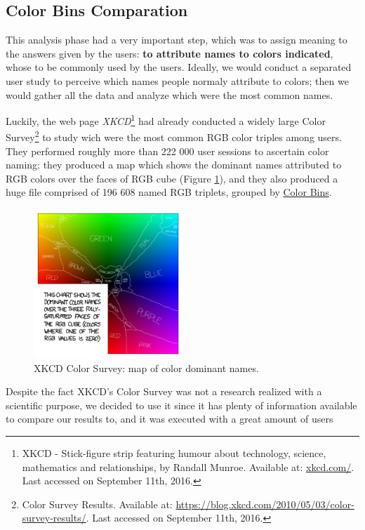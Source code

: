 \subsection{Color Bins Comparation}
\label{subsec:results_preparation}
%
This analysis phase had a very important step, which was to assign meaning to the answers given by the users: \textbf{to attribute names to colors indicated}, whose to be commonly used by the users.
Ideally, we would conduct a separated user study to perceive which names people normaly attribute to colors; then we would gather all the data and analyze which were the most common names. \par
%
Luckily, the web page \emph{XKCD}\footnote{XKCD - Stick-figure strip featuring humour about technology, science, mathematics and relationships, by Randall Munroe.
Available at: \url{xkcd.com/}. Last accessed on September 11th, 2016.} had already conducted a widely large Color Survey\footnote{Color Survey Results. Available at:
\url{https://blog.xkcd.com/2010/05/03/color-survey-results/}. Last accessed on September 11th, 2016.} to study wich were the most common RGB color triples among users. They performed roughly more
than 222 000 user sessions to ascertain color naming: they produced a map which shows the dominant names attributed to \gls{RGB} colors over the faces of \gls{RGB} cube (Figure \ref{fig:colornames_xkcd}),
and they also produced a huge file comprised of 196 608 named \gls{RGB} triplets, grouped by \ul{Color Bins}. \par
%
\begin{figure}[htbp]
	\centering
  \includegraphics[width=0.5\textwidth]{images/satfaces_map.png}
  \caption[XKCD Color Survey: Color Dominant Names]{XKCD Color Survey: map of color dominant names.\protect\footnotemark{}}
  \label{fig:colornames_xkcd}
\end{figure}
%
Despite the fact XKCD's Color Survey was not a research realized with a scientific purpose, we decided to use it since it has plenty of information available to compare our results to, and it was executed with a great amount of users
